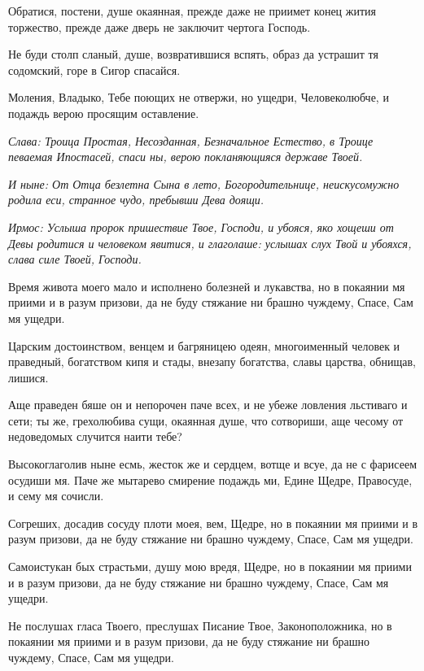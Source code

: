 Обратися, постени, душе окаянная, прежде даже не приимет конец жития торжество, прежде даже дверь не заключит чертога Господь. 

Не буди столп сланый, душе, возвратившися вспять, образ да устрашит тя содомский, горе в Сигор спасайся. 

Моления, Владыко, Тебе поющих не отвержи, но ущедри, Человеколюбче, и подаждь верою просящим оставление. 

\itshape Слава\normalfont{}: Троица Простая, Несозданная, Безначальное Естество, в Троице певаемая Ипостасей, спаси ны, верою покланяющияся державе Твоей. 

\itshape И ныне\normalfont{}: От Отца безлетна Сына в лето, Богородительнице, неискусомужно родила еси, странное чудо, пребывши Дева доящи.



\itshape Ирмос\normalfont{}: Услыша пророк пришествие Твое, Господи, и убояся, яко хощеши от Девы родитися и человеком явитися, и глаголаше: услышах слух Твой и убояхся, слава силе Твоей, Господи. 

Время живота моего мало и исполнено болезней и лукавства, но в покаянии мя приими и в разум призови, да не буду стяжание ни брашно чуждему, Спасе, Сам мя ущедри. 

Царским достоинством, венцем и багряницею одеян, многоименный человек и праведный, богатством кипя и стады, внезапу богатства, славы царства, обнищав, лишися. 

Аще праведен бяше он и непорочен паче всех, и не убеже ловления льстиваго и сети; ты же, грехолюбива сущи, окаянная душе, что сотвориши, аще чесому от недоведомых случится наити тебе? 

Высокоглаголив ныне есмь, жесток же и сердцем, вотще и всуе, да не с фарисеем осудиши мя. Паче же мытарево смирение подаждь ми, Едине Щедре, Правосуде, и сему мя сочисли. 

Согреших, досадив сосуду плоти моея, вем, Щедре, но в покаянии мя приими и в разум призови, да не буду стяжание ни брашно чуждему, Спасе, Сам мя ущедри. 

Самоистукан бых страстьми, душу мою вредя, Щедре, но в покаянии мя приими и в разум призови, да не буду стяжание ни брашно чуждему, Спасе, Сам мя ущедри. 

Не послушах гласа Твоего, преслушах Писание Твое, Законоположника, но в покаянии мя приими и в разум призови, да не буду стяжание ни брашно чуждему, Спасе, Сам мя ущедри. 

\bfseries 

